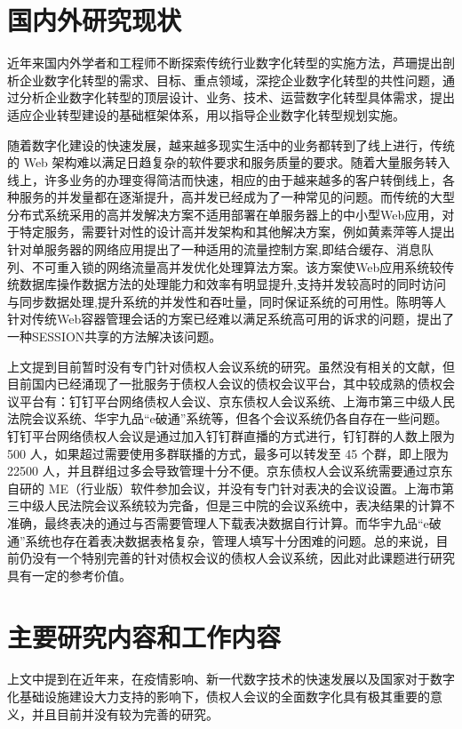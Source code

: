\section{国内外研究现状}
近年来国内外学者和工程师不断探索传统行业数字化转型的实施方法，芦珊\cite{Li1999}提出剖析企业数字化转型的需求、目标、重点领域，深挖企业数字化转型的共性问题，通过分析企业数字化转型的顶层设计、业务、技术、运营数字化转型具体需求，提出适应企业转型建设的基础框架体系，用以指导企业数字化转型规划实施。

随着数字化建设的快速发展，越来越多现实生活中的业务都转到了线上进行，传统的 Web 架构难以满足日趋复杂的软件要求和服务质量的要求。随着大量服务转入线上，许多业务的办理变得简洁而快速，相应的由于越来越多的客户转倒线上，各种服务的并发量都在逐渐提升，高并发已经成为了一种常见的问题。而传统的大型分布式系统采用的高并发解决方案不适用部署在单服务器上的中小型Web应用，对于特定服务，需要针对性的设计高并发架构和其他解决方案，例如黄素萍\cite{Huang}等人提出针对单服务器的网络应用提出了一种适用的流量控制方案,即结合缓存、消息队列、不可重入锁的网络流量高并发优化处理算法方案。该方案使Web应用系统较传统数据库操作数据方法的处理能力和效率有明显提升,支持并发较高时的同时访问与同步数据处理,提升系统的并发性和吞吐量，同时保证系统的可用性。陈明\cite{Chen}等人针对传统Web容器管理会话的方案已经难以满足系统高可用的诉求的问题，提出了一种SESSION共享的方法解决该问题。

上文提到目前暂时没有专门针对债权人会议系统的研究。虽然没有相关的文献，但目前国内已经涌现了一批服务于债权人会议的债权会议平台，其中较成熟的债权会议平台有：钉钉平台网络债权人会议、京东债权人会议系统、上海市第三中级人民法院会议系统、华宇九品“e破通”系统等，但各个会议系统仍各自存在一些问题。钉钉平台网络债权人会议是通过加入钉钉群直播的方式进行，钉钉群的人数上限为 500 人，如果超过需要使用多群联播的方式，最多可以转发至 45 个群，即上限为 22500 人，并且群组过多会导致管理十分不便。京东债权人会议系统需要通过京东自研的 ME（行业版）软件参加会议，并没有专门针对表决的会议设置。上海市第三中级人民法院会议系统较为完备，但是三中院的会议系统中，表决结果的计算不准确，最终表决的通过与否需要管理人下载表决数据自行计算。而华宇九品“e破通”系统也存在着表决数据表格复杂，管理人填写十分困难的问题。总的来说，目前仍没有一个特别完善的针对债权会议的债权人会议系统，因此对此课题进行研究具有一定的参考价值。

\section{主要研究内容和工作内容}
上文中提到在近年来，在疫情影响、新一代数字技术的快速发展以及国家对于数字化基础设施建设大力支持的影响下，债权人会议的全面数字化具有极其重要的意义，并且目前并没有较为完善的研究。

